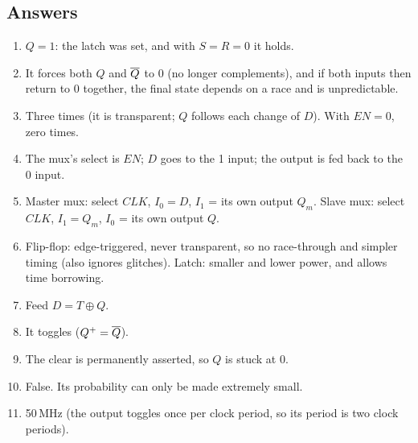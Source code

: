 \subsection*{Answers}
\begin{enumerate}
  \item $Q = 1$: the latch was set, and with $S = R = 0$ it holds.
  \item It forces both $Q$ and $\overline{Q}$ to 0 (no longer complements), and if both inputs then return to 0 together, the final state depends on a race and is unpredictable.
  \item Three times (it is transparent; $Q$ follows each change of $D$). With $EN = 0$, zero times.
  \item The mux's select is $EN$; $D$ goes to the 1 input; the output is fed back to the 0 input.
  \item Master mux: select $CLK$, $I_0 = D$, $I_1$ = its own output $Q_m$. Slave mux: select $CLK$, $I_1 = Q_m$, $I_0$ = its own output $Q$.
  \item Flip-flop: edge-triggered, never transparent, so no race-through and simpler timing (also ignores glitches). Latch: smaller and lower power, and allows time borrowing.
  \item Feed $D = T \oplus Q$.
  \item It toggles ($Q^+ = \overline{Q}$).
  \item The clear is permanently asserted, so $Q$ is stuck at 0.
  \item False. Its probability can only be made extremely small.
  \item 50\,MHz (the output toggles once per clock period, so its period is two clock periods).
\end{enumerate}
